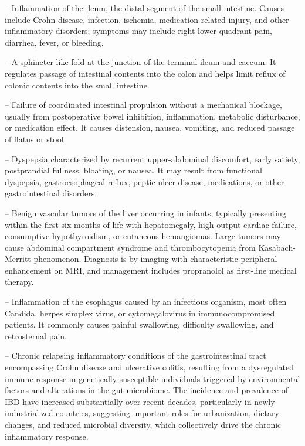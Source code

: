 -- Inflammation of the ileum, the distal segment of the small intestine. Causes include Crohn disease, infection, ischemia, medication-related injury, and other inflammatory disorders; symptoms may include right-lower-quadrant pain, diarrhea, fever, or bleeding.

-- A sphincter-like fold at the junction of the terminal ileum and caecum. It regulates passage of intestinal contents into the colon and helps limit reflux of colonic contents into the small intestine.

-- Failure of coordinated intestinal propulsion without a mechanical blockage, usually from postoperative bowel inhibition, inflammation, metabolic disturbance, or medication effect. It causes distension, nausea, vomiting, and reduced passage of flatus or stool.

-- Dyspepsia characterized by recurrent upper-abdominal discomfort, early satiety, postprandial fullness, bloating, or nausea. It may result from functional dyspepsia, gastroesophageal reflux, peptic ulcer disease, medications, or other gastrointestinal disorders.

-- Benign vascular tumors of the liver occurring in infants, typically presenting within the first six months of life with hepatomegaly, high-output cardiac failure, consumptive hypothyroidism, or cutaneous hemangiomas. Large tumors may cause abdominal compartment syndrome and thrombocytopenia from Kasabach-Merritt phenomenon. Diagnosis is by imaging with characteristic peripheral enhancement on MRI, and management includes propranolol as first-line medical therapy.

-- Inflammation of the esophagus caused by an infectious organism, most often Candida, herpes simplex virus, or cytomegalovirus in immunocompromised patients. It commonly causes painful swallowing, difficulty swallowing, and retrosternal pain.

-- Chronic relapsing inflammatory conditions of the gastrointestinal tract encompassing Crohn disease and ulcerative colitis, resulting from a dysregulated immune response in genetically susceptible individuals triggered by environmental factors and alterations in the gut microbiome. The incidence and prevalence of IBD have increased substantially over recent decades, particularly in newly industrialized countries, suggesting important roles for urbanization, dietary changes, and reduced microbial diversity, which collectively drive the chronic inflammatory response.

